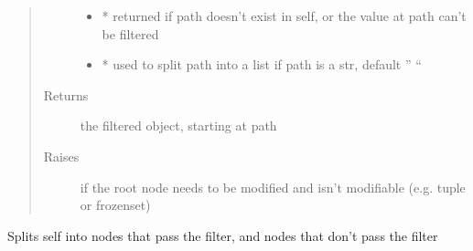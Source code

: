 \documentclass[a4paper,10pt,english]{sphinxmanual}
\begin{document}
\begin{fulllineitems}
\begin{fulllineitems}
\begin{quote}
\begin{description}
\begin{itemize}
\item {}
\sphinxAtStartPar
{} \textendash{} * returned if path doesn’t exist in self, or the value at path can’t be filtered

\item {}
\sphinxAtStartPar
{} \textendash{} * used to split path into a list if path is a str, default ” “

\end{itemize}

\item[{Returns}] \leavevmode
\sphinxAtStartPar
the filtered object, starting at path

\item[{Raises}] \leavevmode
\sphinxAtStartPar
{} \textendash{} if the root node needs to be modified and isn’t modifiable (e.g. tuple or frozenset)

\end{description}\end{quote}

\end{fulllineitems}


\begin{fulllineitems}
\label{\detokenize{fagus.fagus:fagus.fagus.Fagus.split}}
\pysigstartsignatures
{}
\pysigstopsignatures
\sphinxAtStartPar
Splits self into nodes that pass the filter, and nodes that don’t pass the filter


\end{fulllineitems}
\end{fulllineitems}
\end{document}
